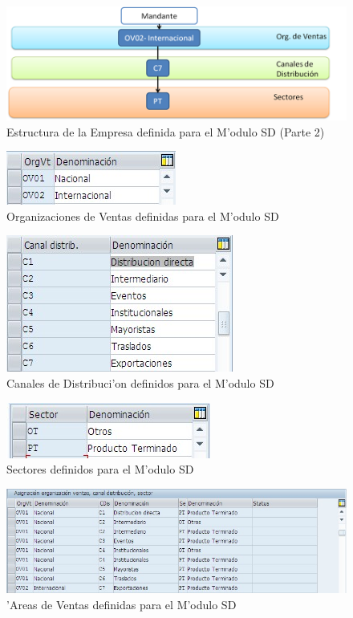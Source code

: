 \begin{figure}[htb]
\centering
\includegraphics[scale=0.45,type=png,ext=.png,read=.png]{figures/Org2}
\caption{Estructura de la Empresa definida para el M'odulo SD (Parte 2)}
\label{fig:estructura}
\end{figure}

\begin{figure}[htb]
\centering
\includegraphics[scale=0.65,type=jpg,ext=.jpg,read=.jpg]{figures/OrgVentas}
\caption{Organizaciones de Ventas definidas para el M'odulo SD}
\label{fig:orgventas}
\end{figure}
\begin{figure}[htb]
\centering
\includegraphics[scale=0.65,type=jpg,ext=.jpg,read=.jpg]{figures/CanalesDistribucion}
\caption{Canales de Distribuci'on definidos para el M'odulo SD}
\label{fig:canales}
\end{figure}
\begin{figure}[htb]
\centering
\includegraphics[scale=0.65,type=jpg,ext=.jpg,read=.jpg]{figures/Sectores}
\caption{Sectores definidos para el M'odulo SD}
\label{fig:sectores}
\end{figure}
\begin{figure}[htb]
\centering
\includegraphics[scale=0.65,type=jpg,ext=.jpg,read=.jpg]{figures/AreaVentas}
\caption{'Areas de Ventas definidas para el M'odulo SD}
\label{fig:areas}
\end{figure}
